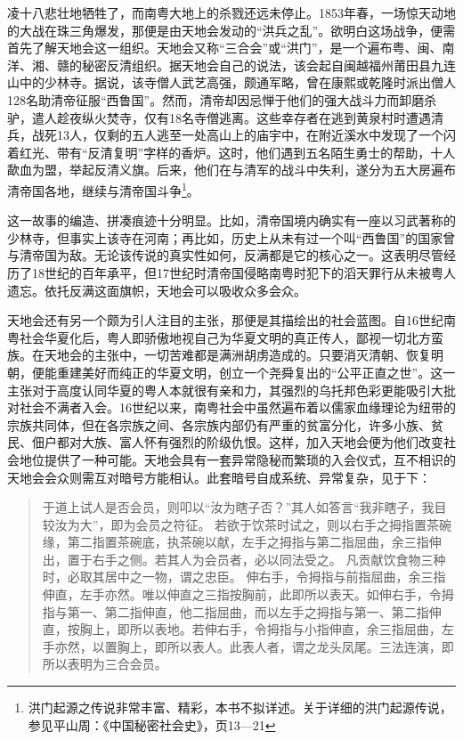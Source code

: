 凌十八悲壮地牺牲了，而南粤大地上的杀戮还远未停止。1853年春，一场惊天动地的大战在珠三角爆发，那便是由天地会发动的“洪兵之乱”。欲明白这场战争，便需首先了解天地会这一组织。天地会又称“三合会”或“洪门”，是一个遍布粤、闽、南洋、湘、赣的秘密反清组织。据天地会自己的说法，该会起自闽越福州莆田县九连山中的少林寺。据说，该寺僧人武艺高强，颇通军略，曾在康熙或乾隆时派出僧人128名助清帝征服“西鲁国”。然而，清帝却因忌惮于他们的强大战斗力而卸磨杀驴，遣人趁夜纵火焚寺，仅有18名寺僧逃离。这些幸存者在逃到黄泉村时遭遇清兵，战死13人，仅剩的五人逃至一处高山上的庙宇中，在附近溪水中发现了一个闪着红光、带有“反清复明”字样的香炉。这时，他们遇到五名陌生勇士的帮助，十人歃血为盟，举起反清义旗。后来，他们在与清军的战斗中失利，遂分为五大房遍布清帝国各地，继续与清帝国斗争\footnote{洪门起源之传说非常丰富、精彩，本书不拟详述。关于详细的洪门起源传说，参见平山周：《中国秘密社会史》，页13—21}。

这一故事的编造、拼凑痕迹十分明显。比如，清帝国境内确实有一座以习武著称的少林寺，但事实上该寺在河南；再比如，历史上从未有过一个叫“西鲁国”的国家曾与清帝国为敌。无论该传说的真实性如何，反满都是它的核心之一。这表明尽管经历了18世纪的百年承平，但17世纪时清帝国侵略南粤时犯下的滔天罪行从未被粤人遗忘。依托反满这面旗帜，天地会可以吸收众多会众。

天地会还有另一个颇为引人注目的主张，那便是其描绘出的社会蓝图。自16世纪南粤社会华夏化后，粤人即骄傲地视自己为华夏文明的真正传人，鄙视一切北方蛮族。在天地会的主张中，一切苦难都是满洲胡虏造成的。只要消灭清朝、恢复明朝，便能重建美好而纯正的华夏文明，创立一个尧舜复出的“公平正直之世”。这一主张对于高度认同华夏的粤人本就很有亲和力，其强烈的乌托邦色彩更能吸引大批对社会不满者入会。16世纪以来，南粤社会中虽然遍布着以儒家血缘理论为纽带的宗族共同体，但在各宗族之间、各宗族内部仍有严重的贫富分化，许多小族、贫民、佃户都对大族、富人怀有强烈的阶级仇恨。这样，加入天地会便为他们改变社会地位提供了一种可能。天地会具有一套异常隐秘而繁琐的入会仪式，互不相识的天地会会众则需互对暗号方能相认。此套暗号自成系统、异常复杂，见于下：

\begin{quote}

于道上试人是否会员，则叩以“汝为瞎子否？”其人如答言“我非瞎子，我目较汝为大”，即为会员之符征。
若欲于饮茶时试之，则以右手之拇指置茶碗缘，第二指置茶碗底，执茶碗以献，左手之拇指与第二指屈曲，余三指伸出，置于右手之侧。若其人为会员者，必以同法受之。
凡贡献饮食物三种时，必取其居中之一物，谓之忠臣。
伸右手，令拇指与前指屈曲，余三指伸直，左手亦然。唯以伸直之三指按胸前，此即所以表天。如伸右手，令拇指与第一、第二指伸直，他二指屈曲，而以左手之拇指与第一、第二指伸直，按胸上，即所以表地。若伸右手，令拇指与小指伸直，余三指屈曲，左手亦然，以置胸上，即所以表人。此表人者，谓之龙头凤尾。三法连演，即所以表明为三合会员。

\end{quote}


